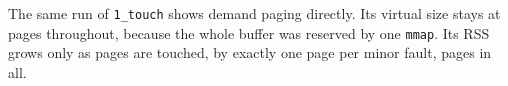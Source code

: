 The same run of \texttt{1\_touch} shows demand paging directly. Its virtual
size stays at \TouchVirtualPages{} pages throughout, because the whole buffer
was reserved by one \texttt{mmap}. Its RSS grows only as pages are touched,
by exactly one page per minor fault, \TouchRssGrowth{} pages in all.
